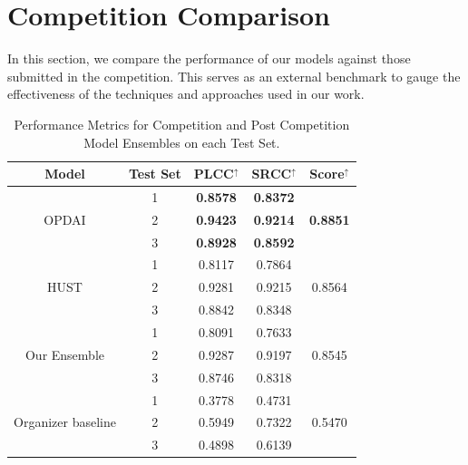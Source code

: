 \documentclass[a4paper,12pt,openright]{book}
\begin{document}
\section{Competition Comparison}
In this section, we compare the performance of our models against those submitted in the competition. This serves as an external benchmark to gauge the effectiveness of the techniques and approaches used in our work. 
\begin{table}[h]

\smallskip
\begin{center}
\begin{tabular}{ | c | c | c | c | c |  }
\hline  
  \textbf{Model} & \textbf{Test Set} & \textbf{PLCC$^{\uparrow}$} & \textbf{SRCC$^{\uparrow}$} & 
  \textbf{Score$^{\uparrow}$}\\ 

\hline
  \multirow{3}{*}{OPDAI} & 1 & \textbf{0.8578} & \textbf{0.8372} &  \multirow{3}{*}{\textbf{0.8851 }} \\
                            & 2 &  \textbf{0.9423}& \textbf{0.9214} & \\
                            & 3 & \textbf{ 0.8928} & \textbf{0.8592} & \\
                             \hline
\multirow{3}{*}{HUST} & 1 & 0.8117 & 0.7864 &  \multirow{3}{*}{0.8564} \\
                            & 2 & 0.9281 &
                            0.9215  &  \\
                            & 3 & 0.8842 & 0.8348&  \\
                            \hline

  \multirow{3}{*}{Our Ensemble} & 1 & 0.8091 & 0.7633  & \multirow{3}{*}{0.8545} \\
                            & 2 & 0.9287 &
                            0.9197 & \\
                            & 3 & 0.8746 & 0.8318&  \\
                            \hline

  \multirow{3}{*}{Organizer baseline\cite{sun2023visual}} & 1 & 0.3778 & 0.4731  & \multirow{3}{*}{0.5470} \\
    & 2 & 0.5949 &
    0.7322 & \\
    & 3 & 0.4898 & 0.6139 &  \\
    \hline




\end{tabular}
\end{center}
\caption{Performance Metrics for Competition and Post Competition Model Ensembles on each Test Set.}
\label{res_final}
\end{table}
\end{document}
